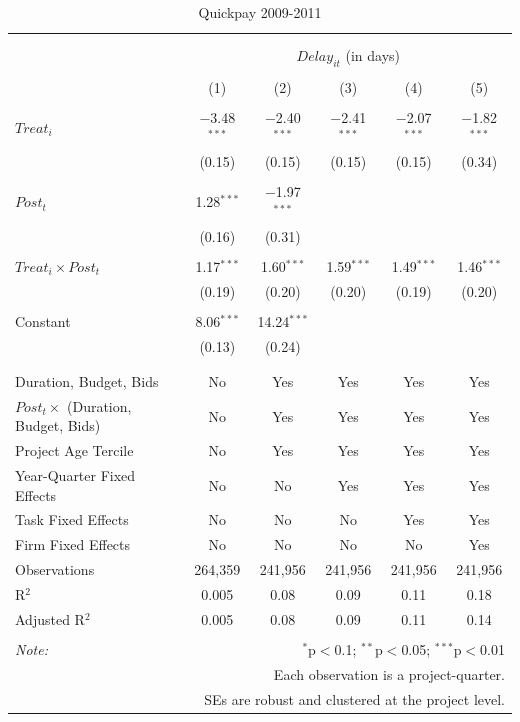 \documentclass[
]{article}
\begin{document}
\begin{table}[H] \centering 
  \caption{Quickpay 2009-2011} 
  \label{} 
\small 
\begin{tabular}{@{\extracolsep{-2pt}}lccccc} 
\\[-1.8ex]\hline 
\hline \\[-1.8ex] 
\\[-1.8ex] & \multicolumn{5}{c}{$Delay_{it}$ (in days)} \\ 
\\[-1.8ex] & (1) & (2) & (3) & (4) & (5)\\ 
\hline \\[-1.8ex] 
 $Treat_i$ & $-$3.48$^{***}$ & $-$2.40$^{***}$ & $-$2.41$^{***}$ & $-$2.07$^{***}$ & $-$1.82$^{***}$ \\ 
  & (0.15) & (0.15) & (0.15) & (0.15) & (0.34) \\ 
  & & & & & \\ 
 $Post_t$ & 1.28$^{***}$ & $-$1.97$^{***}$ &  &  &  \\ 
  & (0.16) & (0.31) &  &  &  \\ 
  & & & & & \\ 
 $Treat_i \times Post_t$ & 1.17$^{***}$ & 1.60$^{***}$ & 1.59$^{***}$ & 1.49$^{***}$ & 1.46$^{***}$ \\ 
  & (0.19) & (0.20) & (0.20) & (0.19) & (0.20) \\ 
  & & & & & \\ 
 Constant & 8.06$^{***}$ & 14.24$^{***}$ &  &  &  \\ 
  & (0.13) & (0.24) &  &  &  \\ 
  & & & & & \\ 
\hline \\[-1.8ex] 
Duration, Budget, Bids & No & Yes & Yes & Yes & Yes \\ 
$Post_t \times$  (Duration, Budget, Bids) & No & Yes & Yes & Yes & Yes \\ 
Project Age Tercile & No & Yes & Yes & Yes & Yes \\ 
Year-Quarter Fixed Effects & No & No & Yes & Yes & Yes \\ 
Task Fixed Effects & No & No & No & Yes & Yes \\ 
Firm Fixed Effects & No & No & No & No & Yes \\ 
Observations & 264,359 & 241,956 & 241,956 & 241,956 & 241,956 \\ 
R$^{2}$ & 0.005 & 0.08 & 0.09 & 0.11 & 0.18 \\ 
Adjusted R$^{2}$ & 0.005 & 0.08 & 0.09 & 0.11 & 0.14 \\ 
\hline 
\hline \\[-1.8ex] 
\textit{Note:}  & \multicolumn{5}{r}{$^{*}$p$<$0.1; $^{**}$p$<$0.05; $^{***}$p$<$0.01} \\ 
 & \multicolumn{5}{r}{Each observation is a project-quarter.} \\ 
 & \multicolumn{5}{r}{SEs are robust and clustered at the project level.} \\ 
\end{tabular} 
\end{table}
\end{document}
